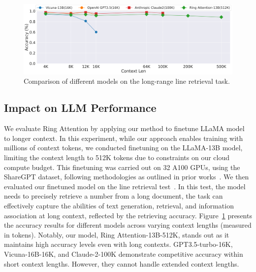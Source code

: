 \documentclass{article}
\newcommand{\oursabb}{{Ring Attention}\xspace}
\begin{document}
\begin{figure}[!tb]
\vspace{-1.5em}
\vspace{0.3em}
\centering
\includegraphics[width=1\textwidth]{figures/context_acc.png}
\vspace{-1.5em}
\caption{Comparison of different models on the long-range line retrieval task.}
\label{fig:context_acc}
\vspace{-1.5em}
\end{figure}
\subsection{Impact on LLM Performance}
\label{sec:llm}
We evaluate \oursabb by applying our method to finetune LLaMA model to longer context.
In this experiment, while our approach enables training with millions of context tokens,
we conducted finetuning on the LLaMA-13B model, limiting the context length to 512K tokens due to constraints on our cloud compute budget.
This finetuning was carried out on 32 A100 GPUs, using the ShareGPT dataset, following methodologies as outlined in prior works~\citep{chiang2023vicuna,geng2023koala}.
We then evaluated our finetuned model on the line retrieval test~\citep{longchat2023}. In this test, the model needs to precisely retrieve a number from a long document, the task can effectively capture the abilities of text generation, retrieval, and information association at long context, reflected by the retrieving accuracy.
Figure~\ref{fig:context_acc} presents the accuracy results for different models across varying context lengths (measured in tokens). Notably, our model, {\oursabb}-13B-512K, stands out as it maintains high accuracy levels even with long contexts.
GPT3.5-turbo-16K, Vicuna-16B-16K, and  Claude-2-100K demonstrate competitive accuracy within short context lengths. However, they cannot handle extended context lengths.
\end{document}
